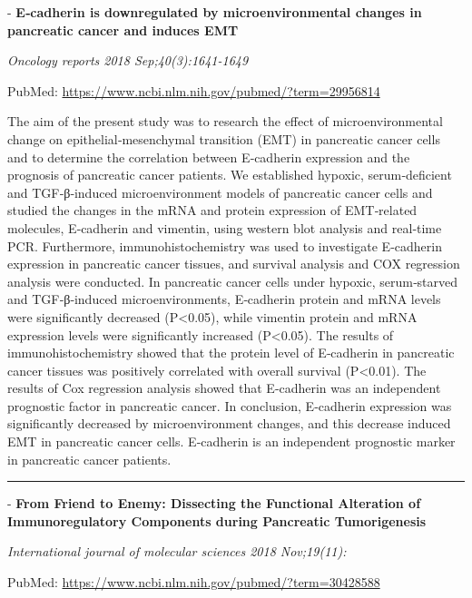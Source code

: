 \documentclass[]{article}
\begin{document}
 - \textbf{E‑cadherin is downregulated by microenvironmental changes in
pancreatic cancer and induces EMT}

\emph{Oncology reports 2018 Sep;40(3):1641-1649}

PubMed: \url{https://www.ncbi.nlm.nih.gov/pubmed/?term=29956814}

The aim of the present study was to research the effect of
microenvironmental change on epithelial‑mesenchymal transition (EMT) in
pancreatic cancer cells and to determine the correlation between
E‑cadherin expression and the prognosis of pancreatic cancer patients.
We established hypoxic, serum‑deficient and TGF‑β‑induced
microenvironment models of pancreatic cancer cells and studied the
changes in the mRNA and protein expression of EMT‑related molecules,
E‑cadherin and vimentin, using western blot analysis and real‑time PCR.
Furthermore, immunohistochemistry was used to investigate E‑cadherin
expression in pancreatic cancer tissues, and survival analysis and COX
regression analysis were conducted. In pancreatic cancer cells under
hypoxic, serum‑starved and TGF‑β‑induced microenvironments, E‑cadherin
protein and mRNA levels were significantly decreased (P\textless{}0.05),
while vimentin protein and mRNA expression levels were significantly
increased (P\textless{}0.05). The results of immunohistochemistry showed
that the protein level of E‑cadherin in pancreatic cancer tissues was
positively correlated with overall survival (P\textless{}0.01). The
results of Cox regression analysis showed that E‑cadherin was an
independent prognostic factor in pancreatic cancer. In conclusion,
E‑cadherin expression was significantly decreased by microenvironment
changes, and this decrease induced EMT in pancreatic cancer cells.
E‑cadherin is an independent prognostic marker in pancreatic cancer
patients.

{}

{}

\begin{center}\rule{0.5\linewidth}{\linethickness}\end{center}

 - \textbf{From Friend to Enemy: Dissecting the Functional Alteration of
Immunoregulatory Components during Pancreatic Tumorigenesis}

\emph{International journal of molecular sciences 2018 Nov;19(11):}

PubMed: \url{https://www.ncbi.nlm.nih.gov/pubmed/?term=30428588}
\end{document}
